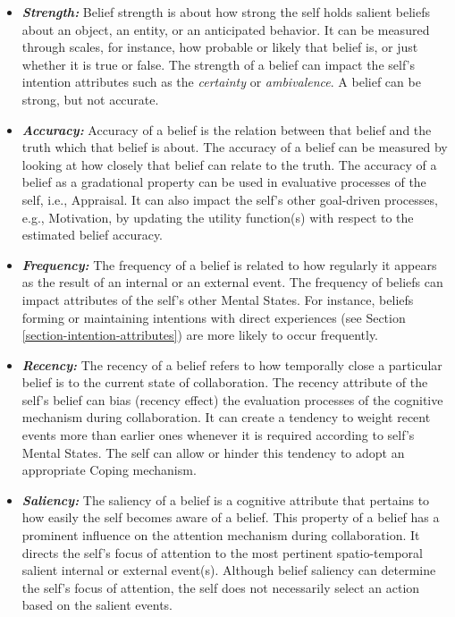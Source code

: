\documentclass[letterpaper]{article}
\begin{document}
\begin{itemize}
  \item \textbf{\textit{Strength:}} Belief strength is about how strong the self
  holds salient beliefs about an object, an entity, or an anticipated behavior.
  It can be measured through scales, for instance, how probable or likely that
  belief is, or just whether it is true or false. The strength of a belief can
  impact the self's intention attributes such as the \textit{certainty} or
  \textit{ambivalence}. A belief can be strong, but not accurate.
  
  \item \textbf{\textit{Accuracy:}} Accuracy of a belief is the relation between
  that belief and the truth which that belief is about. The accuracy of a belief
  can be measured by looking at how closely that belief can relate to the truth.
  The accuracy of a belief as a gradational property can be used in evaluative
  processes of the self, i.e., Appraisal. It can also impact the self's other
  goal-driven processes, e.g., Motivation, by updating the utility function(s)
  with respect to the estimated belief accuracy.
  
  \item \textbf{\textit{Frequency:}} The frequency of a belief is related to how
  regularly it appears as the result of an internal or an external event. The
  frequency of beliefs can impact attributes of the self's other Mental States.
  For instance, beliefs forming or maintaining intentions with direct
  experiences (see Section \ref{section-intention-attributes}) are more likely
  to occur frequently.
  
  \item \textbf{\textit{Recency:}} The recency of a belief refers to how
  temporally close a particular belief is to the current state of collaboration.
  The recency attribute of the self's belief can bias (recency effect) the
  evaluation processes of the cognitive mechanism during collaboration. It can
  create a tendency to weight recent events more than earlier ones whenever it
  is required according to self's Mental States. The self can allow or hinder
  this tendency to adopt an appropriate Coping mechanism.
  
  \item \textbf{\textit{Saliency:}} The saliency of a belief is a cognitive
  attribute that pertains to how easily the self becomes aware of a belief.
  This property of a belief has a prominent influence on the attention mechanism
  during collaboration. It directs the self's focus of attention to the most
  pertinent spatio-temporal salient internal or external event(s). Although
  belief saliency can determine the self's focus of attention, the self does not
  necessarily select an action based on the salient events.
  

\end{itemize}
\end{document}
